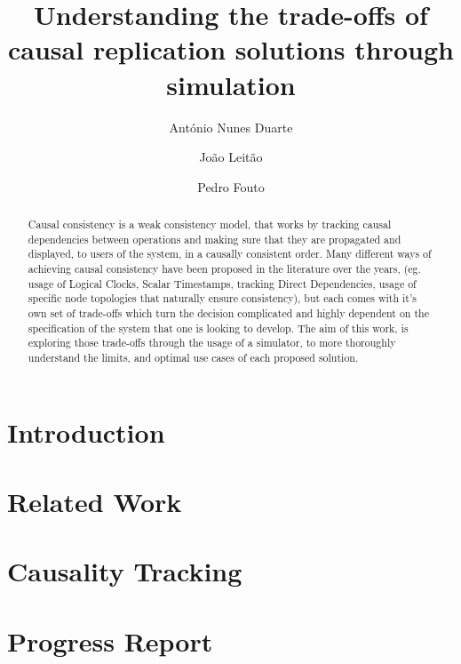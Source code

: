 \documentclass[runningheads]{llncs}
\begin{document}
%
\title{Understanding the trade-offs of causal replication solutions through simulation}
%
%
\author{António Nunes Duarte \and
João Leitão \and
Pedro Fouto}
%
%
%
\maketitle              %
%
\begin{abstract}
Causal consistency is a weak consistency model, that works by 
tracking causal dependencies between operations and making sure that they are propagated 
and displayed, to users of the system, in a causally consistent order.
Many different ways of achieving causal consistency have been proposed in the literature
over the years, (eg. usage of Logical Clocks\cite{baquero2016logical}, 
Scalar Timestamps\cite{du2014gentlerain}, tracking Direct Dependencies\cite{lloyd2011don}, 
usage of specific node topologies that naturally ensure consistency\cite{van2020intrinsic}),
but each comes with it's own set of trade-offs which turn the decision complicated 
and	highly dependent on the specification of the system that one is looking to develop. The aim of this work, is 
exploring those trade-offs through the usage of a simulator, to more thoroughly understand the limits,
and optimal use cases of each proposed solution.

\end{abstract}

\section{Introduction}

\section{Related Work}

\section{Causality Tracking}

\section{Progress Report}

%
%
%
% 
% 
%



\end{document}
